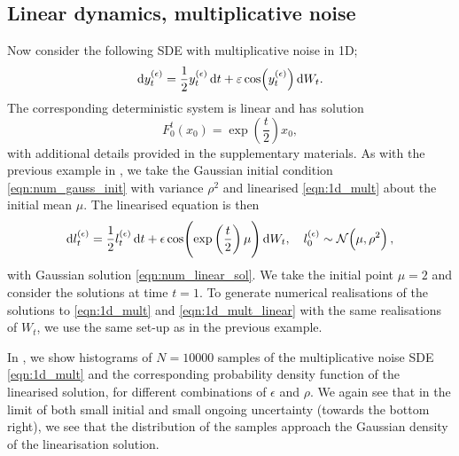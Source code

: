 \subsection{Linear dynamics, multiplicative noise}\label{sec:numerics_multiplicative}
Now consider the following SDE with multiplicative noise in 1D;
\begin{equation}
	\dif y_t^{(\epsilon)} = \frac12 y_t^{(\epsilon)}\dif t + \varepsilon \cos\!\left(y_t^{(\epsilon)}\right) \dif W_t.
	\label{eqn:1d_mult}
\end{equation}
The corresponding deterministic system is linear and has solution
\begin{equation}
	F_0^t\!\left(x_0\right) = \exp\!\left(\frac{t}{2}\right) x_0,
	\label{eqn:1d_mult_det_sol}
\end{equation}
with additional details provided in the supplementary materials.
As with the previous example in , we take the Gaussian initial condition \cref{eqn:num_gauss_init} with variance \(\rho^2\) and linearised \cref{eqn:1d_mult} about the initial mean \(\mu\).
The linearised equation is then
\begin{equation}
	\dif l_t^{(\epsilon)} = \frac12 l_t^{(\epsilon)}\dif t + \epsilon \cos\!\left(\exp\left(\frac{t}{2}\right)\mu\right) \dif W_t, \quad l_0^{(\epsilon)} \sim \Gauss{\mu, \rho^2},
	\label{eqn:1d_mult_linear}
\end{equation}
with Gaussian solution \cref{eqn:num_linear_sol}.
We take the initial point \(\mu = 2\) and consider the solutions at time \(t = 1\).
To generate numerical realisations of the solutions to \cref{eqn:1d_mult} and \cref{eqn:1d_mult_linear} with the same realisations of \(W_t\), we use the same set-up as in the previous example.

In , we show histograms of \(N = 10000\) samples of the multiplicative noise SDE \cref{eqn:1d_mult} and the corresponding probability density function of the linearised solution, for different combinations of \(\epsilon\) and \(\rho\).
We again see that in the limit of both small initial and small ongoing uncertainty (towards the bottom right), we see that the distribution of the samples approach the Gaussian density of the linearisation solution.


